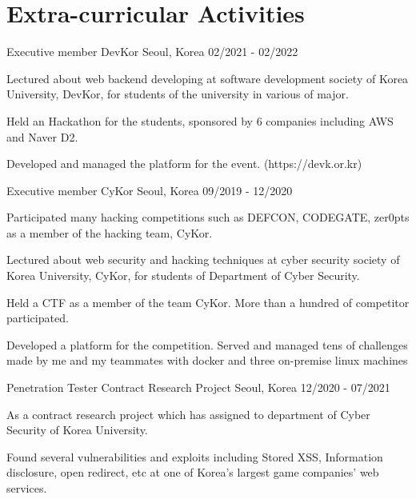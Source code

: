 \section{Extra-curricular Activities}

\cventry
{Executive member} %
{DevKor} %
{Seoul, Korea} %
{02/2021 - 02/2022} %
\begin{cvitems}
\item {Lectured about web backend developing at software development society of Korea University, DevKor, for students of the university in various of major.}
\item {Held an Hackathon for the students, sponsored by 6 companies including AWS and Naver D2.}
\item {Developed and managed the platform for the event. (https://devk.or.kr)}
\end{cvitems}

\cventry
{Executive member} %
{CyKor} %
{Seoul, Korea} %
{09/2019 - 12/2020} %
\begin{cvitems}
\item {Participated many hacking competitions such as DEFCON, CODEGATE, zer0pts as a member of the hacking team, CyKor.}
\item {Lectured about web security and hacking techniques at cyber security society of Korea University, CyKor, for students of Department of Cyber Security.}
\item {Held a CTF as a member of the team CyKor. More than a hundred of competitor participated.}
\item {Developed a platform for the competition. Served and managed tens of challenges made by me and my teammates with docker and three on-premise linux machines}
\end{cvitems}

\cventry
{Penetration Tester} %
{Contract Research Project} %
{Seoul, Korea} %
{12/2020 - 07/2021} %
\begin{cvitems}
\item {As a contract research project which has assigned to department of Cyber Security of Korea University.}
\item {Found several vulnerabilities and exploits including Stored XSS, Information disclosure, open redirect, etc at one of Korea's largest game companies' web services.}
\end{cvitems}

